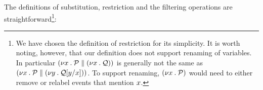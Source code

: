 



The definitions of substitution, restriction and the filtering operations %
are straightforward\footnote{We have chosen the definition of restriction for
  its simplicity.  It is worth noting, however, that our definition does not
  support renaming of variables.  In particular
  $(\nu x\mathbin.\mathcal{P}\parallel(\nu x\mathbin.\mathcal{Q}))$ is generally not the same
  as $(\nu x\mathbin.\mathcal{P}\parallel(\nu y\mathbin.\mathcal{Q}[y/x]))$.  To
  support renaming, $(\nu x\mathbin.\mathcal{P})$ would need to either remove or
  relabel events that mention $x$.}:

